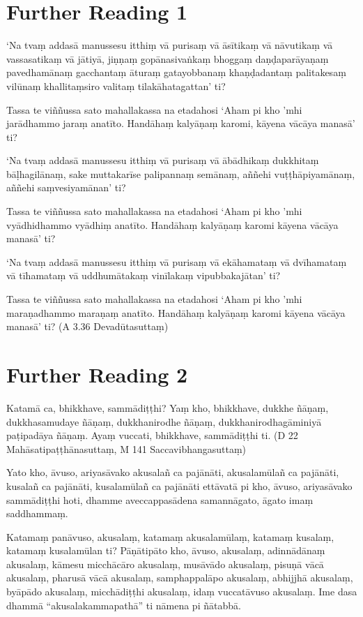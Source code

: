 \section*{Further Reading 1}

‘Na tvaṃ addasā manussesu itthiṃ vā purisaṃ vā āsītikaṃ vā nāvutikaṃ vā vassasatikaṃ vā jātiyā, jiṇṇaṃ gopānasivaṅkaṃ bhoggaṃ daṇḍaparāyaṇaṃ pavedhamānaṃ gacchantaṃ āturaṃ gatayobbanaṃ khaṇḍadantaṃ palitakesaṃ vilūnaṃ khallitaṃsiro valitaṃ tilakāhatagattan’ ti?

Tassa te viññussa sato mahallakassa na etadahosi ‘Aham pi kho ’mhi jarādhammo jaraṃ anatīto. Handāhaṃ kalyāṇaṃ karomi, kāyena vācāya manasā’ ti?

‘Na tvaṃ addasā manussesu itthiṃ vā purisaṃ vā ābādhikaṃ dukkhitaṃ bāḷhagilānaṃ, sake muttakarīse palipannaṃ semānaṃ, aññehi vuṭṭhāpiyamānaṃ, aññehi saṃvesiyamānan’ ti?

Tassa te viññussa sato mahallakassa na etadahosi ‘Aham pi kho ’mhi vyādhidhammo vyādhiṃ anatīto. Handāhaṃ kalyāṇaṃ karomi kāyena vācāya manasā’ ti?

‘Na tvaṃ addasā manussesu itthiṃ vā purisaṃ vā ekāhamataṃ vā dvīhamataṃ vā tīhamataṃ vā uddhumātakaṃ vinīlakaṃ vipubbakajātan’ ti?

Tassa te viññussa sato mahallakassa na etadahosi ‘Aham pi kho ’mhi maraṇadhammo maraṇaṃ anatīto. Handāhaṃ kalyāṇaṃ karomi kāyena vācāya manasā’ ti? \hfill(A 3.36 Devadūtasuttaṃ)

\section*{Further Reading 2}

Katamā ca, bhikkhave, sammādiṭṭhi? Yaṃ kho, bhikkhave, dukkhe ñāṇaṃ, dukkhasamudaye ñāṇaṃ, dukkhanirodhe ñāṇaṃ, dukkhanirodhagāminiyā paṭipadāya ñāṇaṃ. Ayaṃ vuccati, bhikkhave, sammādiṭṭhi ti. \hfill(D 22 Mahāsatipaṭṭhānasuttaṃ, M 141 Saccavibhangasuttaṃ)

Yato kho, āvuso, ariyasāvako akusalañ ca pajānāti, akusalamūlañ ca pajānāti, kusalañ ca pajānāti, kusalamūlañ ca pajānāti ettāvatā pi kho, āvuso, ariyasāvako sammādiṭṭhi hoti, dhamme aveccappasādena samannāgato, āgato imaṃ saddhammaṃ.

Katamaṃ panāvuso, akusalaṃ, katamaṃ akusalamūlaṃ, katamaṃ kusalaṃ, katamaṃ kusalamūlan ti? Pāṇātipāto kho, āvuso, akusalaṃ, adinnādānaṃ akusalaṃ, kāmesu micchācāro akusalaṃ, musāvādo akusalaṃ, pisuṇā vācā akusalaṃ, pharusā vācā akusalaṃ, samphappalāpo akusalaṃ, abhijjhā akusalaṃ, byāpādo akusalaṃ, micchādiṭṭhi akusalaṃ, idaṃ vuccatāvuso akusalaṃ. Ime dasa dhammā “akusalakammapathā” ti nāmena pi ñātabbā.

